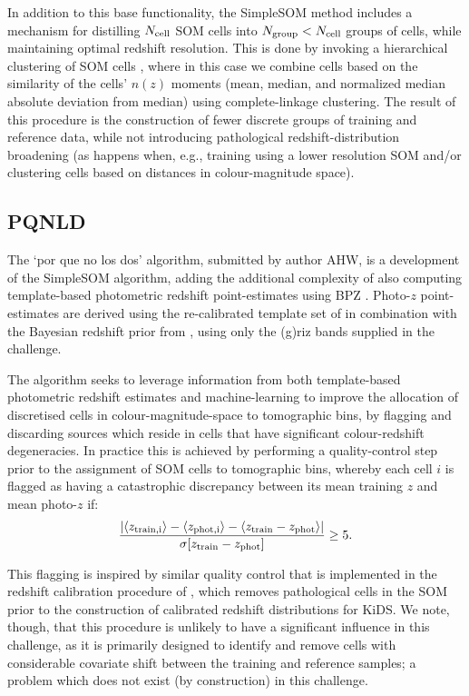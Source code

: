 \documentclass[twocolumn,twocolappendix]{aastex63}
\begin{document}
In addition to this base functionality, the SimpleSOM method includes a
mechanism for distilling $N_{\rm cell}$ SOM cells into $N_{\rm group}<N_{\rm
cell}$ groups of cells, while maintaining optimal redshift resolution. This is
done by invoking a hierarchical clustering of SOM cells \citep[see Appendix B of
][]{Wright/etal:2020a}, where in this case we combine cells based on the
similarity of the cells' $n(z)$ moments (mean, median, and normalized median absolute
deviation from median) using complete-linkage clustering. The result of this
procedure is the construction of fewer discrete groups of training and reference
data, while not introducing pathological redshift-distribution broadening (as
happens when, e.g., training using a lower resolution SOM and/or clustering
cells based on distances in colour-magnitude space). 

\subsection{PQNLD} \label{sec:pqnld}

The `por que no los dos' algorithm, submitted by author AHW, is a development of the SimpleSOM algorithm, adding the 
additional complexity of also computing template-based photometric redshift point-estimates using BPZ 
\citep{Benitez:2000}. Photo-$z$ point-estimates are derived using the re-calibrated 
template set of \cite{Capak:2004} in combination with 
the Bayesian redshift prior from \cite{Raichoor/etal:2014}, using only the (g)riz bands supplied in the challenge. 

The algorithm seeks to leverage information from both template-based 
photometric redshift estimates and machine-learning to improve the allocation of discretised cells in 
colour-magnitude-space to tomographic bins, by flagging and discarding sources which reside in cells that have 
significant colour-redshift degeneracies. In practice this is achieved by performing a quality-control step prior to 
the assignment of SOM cells to tomographic bins, whereby each cell $i$ is flagged as having a catastrophic 
discrepancy between its mean training $z$ and mean photo-$z$ if: 
\begin{equation}
\frac{|\langle z_{\rm train,i}\rangle - \langle z_{\rm phot,i}\rangle  -\langle z_{\rm train} - z_{\rm phot}\rangle|}
{\sigma[z_{\rm train} - z_{\rm phot}]} \geq 5.
\end{equation}

This flagging is inspired by similar quality control that is implemented in the redshift calibration procedure of
\citet{Wright/etal:2020a}, which removes pathological cells in the SOM prior to the construction of calibrated 
redshift distributions for KiDS. We note, though, that this procedure is unlikely to have a significant influence in this 
challenge, as it is primarily designed to identify and remove cells with considerable covariate shift between the 
training and reference samples; a problem which does not exist (by construction) in this challenge.
\end{document}
